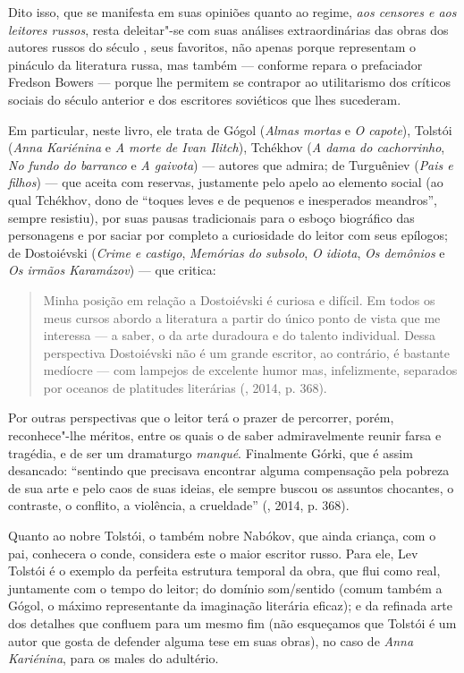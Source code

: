 Dito isso, que se manifesta em suas opiniões quanto ao regime, \emph{aos
censores e aos leitores russos}, resta deleitar"-se com suas análises
extraordinárias das obras dos autores russos do século , seus
favoritos, não apenas porque representam o pináculo da literatura russa,
mas também --- conforme repara o prefaciador Fredson Bowers --- porque
lhe permitem se contrapor ao utilitarismo dos críticos sociais do século
anterior e dos escritores soviéticos que lhes sucederam.

Em particular, neste livro, ele trata de Gógol (\emph{Almas mortas} e
\emph{O capote}), Tolstói (\emph{Anna Kariénina} e \emph{A morte de Ivan
Ilitch}), Tchékhov (\emph{A dama do cachorrinho}, \emph{No fundo do
barranco} e \emph{A gaivota}) --- autores que admira; de Turguêniev
(\emph{Pais e filhos}) --- que aceita com reservas, justamente pelo apelo
ao elemento social (ao qual Tchékhov, dono de ``toques leves e de
pequenos e inesperados meandros'', sempre resistiu), por suas pausas
tradicionais para o esboço biográfico das personagens e por saciar por
completo a curiosidade do leitor com seus epílogos; de Dostoiévski
(\emph{Crime e castigo}, \emph{Memórias do subsolo}, \emph{O idiota},
\emph{Os demônios} e \emph{Os irmãos Karamázov}) --- que critica:

\begin{quotation}
Minha posição em relação a Dostoiévski é curiosa e difícil. Em todos os meus
cursos abordo a literatura a partir do único ponto de vista que me
interessa --- a saber, o da arte duradoura e do talento individual. Dessa
perspectiva Dostoiévski não é um grande escritor, ao contrário, é
bastante medíocre --- com lampejos de excelente humor mas, infelizmente,
separados por oceanos de platitudes literárias (, 2014, p. 368).
\end{quotation}

Por outras perspectivas que o leitor terá o prazer de percorrer, porém,
reconhece"-lhe méritos, entre os quais o de saber admiravelmente reunir
farsa e tragédia, e de ser um dramaturgo \emph{manqué}. Finalmente
Górki, que é assim desancado: ``sentindo que precisava encontrar alguma
compensação pela pobreza de sua arte e pelo caos de suas ideias, ele
sempre buscou os assuntos chocantes, o contraste, o conflito, a
violência, a crueldade'' (, 2014, p. 368).

Quanto ao nobre Tolstói, o também nobre Nabókov, que ainda criança,
com o pai, conhecera o conde, considera este o maior escritor
russo. Para ele, Lev Tolstói é o exemplo da perfeita estrutura temporal da obra, que
flui como real, juntamente com o tempo do leitor; do domínio som/sentido
(comum também a Gógol, o máximo representante da imaginação literária
eficaz); e da refinada arte dos detalhes que confluem para um mesmo fim (não
esqueçamos que Tolstói é um autor que gosta de defender alguma tese em suas
obras), no caso de \emph{Anna Kariénina}, para os males do adultério.

